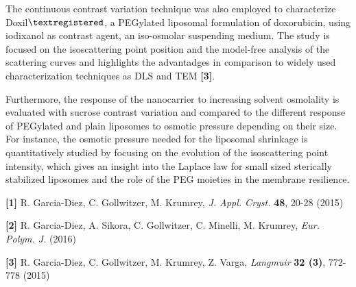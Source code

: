 The continuous contrast variation technique was also employed to characterize Doxil$\textregistered$, a PEGylated liposomal formulation of doxorubicin, using iodixanol as contrast agent, an iso-osmolar suspending medium. The study is focused on the isoscattering point position and the model-free analysis of the scattering curves and highlights the advantadges in comparison to widely used characterization techniques as DLS and TEM \textbf{[3]}. 

Furthermore, the response of the nanocarrier to increasing solvent osmolality is evaluated with sucrose contrast variation and compared to the different response of PEGylated and plain liposomes to osmotic pressure depending on their size. For instance, the osmotic pressure needed for the liposomal shrinkage is quantitatively studied by focusing on the evolution of the isoscattering point intensity, which gives an insight into the Laplace law for small sized sterically stabilized liposomes and the role of the PEG moieties in the membrane resilience.

\bigskip

\footnotesize\textbf{[1]} R. Garcia-Diez, C. Gollwitzer, M. Krumrey, \emph{J. Appl. Cryst.} \textbf{48}, 20-28 (2015)

\footnotesize\textbf{[2]} R. Garcia-Diez, A. Sikora, C. Gollwitzer, C. Minelli, M. Krumrey, \emph{Eur. Polym. J.} (2016)

\footnotesize\textbf{[3]} R. Garcia-Diez, C. Gollwitzer, M. Krumrey, Z. Varga, \emph{Langmuir} \textbf{32 (3)}, 772-778 (2015)

